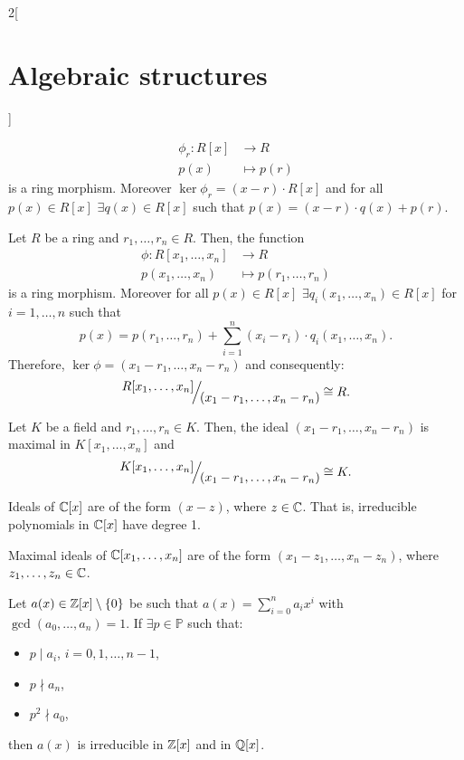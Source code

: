 \documentclass[../../../main.tex]{subfiles}
\begin{document}
\begin{multicols}{2}[\section{Algebraic structures}]
\begin{corollary}
\begin{align*}
        \phi_r:R[x]&\longrightarrow R\\
        p(x)&\longmapsto p(r)        
    \end{align*}
    is a ring morphism. Moreover $\ker\phi_r=(x-r)\cdot R[x]$ and for all $p(x)\in R[x]$ $\exists q(x)\in R[x]$ such that $p(x)=(x-r)\cdot q(x)+p(r)$.
\end{corollary}
\begin{corollary}
    Let $R$ be a ring and $r_1,\ldots,r_n\in R$. Then, the function 
    \begin{align*}
        \phi:R[x_1,\ldots,x_n]&\longrightarrow R\\
        p(x_1,\ldots,x_n)&\longmapsto p(r_1,\ldots,r_n)        
    \end{align*}
    is a ring morphism. Moreover for all $p(x)\in R[x]$ $\exists q_i(x_1,\ldots,x_n)\in R[x]$ for $i=1,\ldots,n$ such that $$p(x)=p(r_1,\ldots,r_n)+\sum_{i=1}^n(x_i-r_i)\cdot q_i(x_1,\ldots,x_n).$$ Therefore, $\ker\phi=(x_1-r_1,\ldots,x_n-r_n)$ and consequently: $$\quot{R[x_1,\ldots,x_n]}{(x_1-r_1,\ldots,x_n-r_n)}\cong R.$$
\end{corollary}
\begin{corollary}
    Let $K$ be a field and $r_1,\ldots,r_n\in K$. Then, the ideal $(x_1-r_1,\ldots,x_n-r_n)$ is maximal in $K[x_1,\ldots,x_n]$ and $$\quot{K[x_1,\ldots,x_n]}{(x_1-r_1,\ldots,x_n-r_n)}\cong K.$$
\end{corollary}
\begin{theorem}
    Ideals of $\mathbb{C}[x]$ are of the form $(x-z)$, where $z\in\mathbb{C}$. That is, irreducible polynomials in $\mathbb{C}[x]$ have degree 1.
\end{theorem}
\begin{theorem}
    Maximal ideals of $\mathbb{C}[x_1,\ldots,x_n]$ are of the form $(x_1-z_1,\ldots,x_n-z_n)$, where $z_1,\ldots,z_n\in\mathbb{C}$.
\end{theorem}
\begin{theorem}
    Let $a(x)\in\mathbb{Z}[x]\setminus\{0\}$ be such that $a(x)=\sum_{i=0}^na_ix^i$ with $\gcd(a_0,\ldots,a_n)=1$. If $\exists p\in\mathbb{P}$ such that:
    \begin{itemize}
        \item $p\mid a_i$, $i=0,1,\ldots,n-1$,
        \item $p\nmid a_n$,
        \item $p^2\nmid a_0$,
    \end{itemize}
    then $a(x)$ is irreducible in $\mathbb{Z}[x]$ and in $\mathbb{Q}[x]$.

\end{theorem}
\end{multicols}
\end{document}
